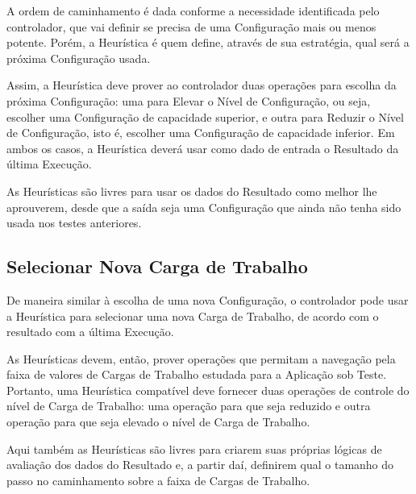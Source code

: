A ordem de caminhamento é dada conforme a necessidade identificada pelo 
controlador, que vai definir se precisa de uma Configuração mais ou menos potente.
Porém, a Heurística é quem define, através de sua estratégia, qual será a próxima
Configuração usada.

Assim, a Heurística deve prover ao controlador duas operações para escolha da 
próxima Configuração: uma para Elevar o Nível de Configuração, ou seja, escolher
uma Configuração de capacidade superior, e outra para Reduzir o Nível de 
Configuração, isto é, escolher uma Configuração de capacidade inferior. Em ambos
os casos, a Heurística deverá usar como dado de entrada o Resultado da última 
Execução.

As Heurísticas são livres para usar os dados do Resultado como melhor lhe 
aprouverem, desde que a saída seja uma Configuração que ainda não tenha sido 
usada nos testes anteriores. 

\subsection{Selecionar Nova Carga de Trabalho}
De maneira similar à escolha de uma nova Configuração, o controlador pode usar
a Heurística para selecionar uma nova Carga de Trabalho, de acordo com o 
resultado com a última Execução.

As Heurísticas devem, então, prover operações que permitam a navegação pela
faixa de valores de Cargas de Trabalho estudada para a Aplicação sob Teste. 
Portanto, uma Heurística compatível deve fornecer duas operações de controle do
nível de Carga de Trabalho: uma operação para que seja reduzido e outra operação 
para que seja elevado o nível de Carga de Trabalho.

Aqui também as Heurísticas são livres para criarem suas próprias lógicas de 
avaliação dos dados do Resultado e, a partir daí, definirem qual o tamanho do
passo no caminhamento sobre a faixa de Cargas de Trabalho.

